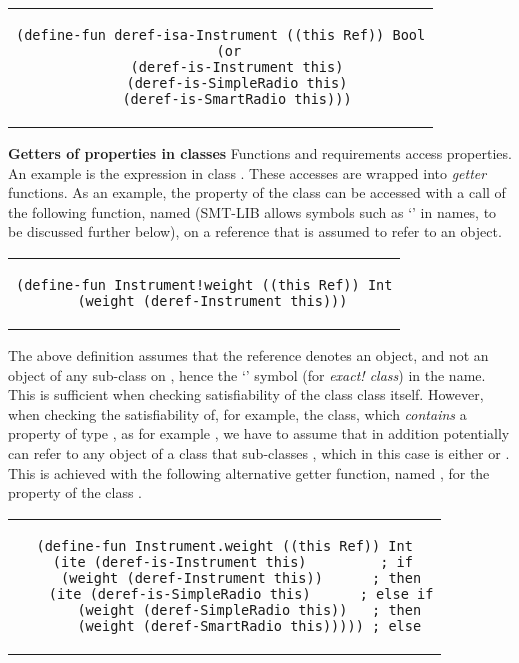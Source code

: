 \begin{center}
\begin{tabular}{c}
\begin{lstlisting}
(define-fun deref-isa-Instrument ((this Ref)) Bool
  (or
    (deref-is-Instrument this)
    (deref-is-SimpleRadio this)
    (deref-is-SmartRadio this)))
\end{lstlisting}
\end{tabular}
\end{center}

\textbf{Getters of properties in classes} Functions and requirements
access properties. An example is the expression  in
class .  These accesses are wrapped into {\em getter}
functions. As an example, the  property of the class
 can be accessed with a call of the following
function, named  (SMT-LIB allows symbols such
as `\code{!}'  in names, to be discussed further below), on a
reference that is assumed to refer to an  object.

\begin{center}
\begin{tabular}{c}
\begin{lstlisting}
(define-fun Instrument!weight ((this Ref)) Int
  (weight (deref-Instrument this)))
\end{lstlisting}
\end{tabular}
\end{center}

The above definition assumes that the  reference denotes an
 object, and not an object of any sub-class on
, hence the `\code{!}' symbol (for {\em exact!
  class}) in the name.  This is sufficient when checking
satisfiability of the class  class itself. However,
when checking the satisfiability of, for example, the 
class, which {\em contains} a property of type , as
for example , we have to assume that
 in addition potentially can refer to any object of a
class that sub-classes , which in this case is either
 or . This is achieved with the
following alternative getter function, named ,
for the  property of the class .

\begin{center}
\begin{tabular}{c}
\begin{lstlisting}
(define-fun Instrument.weight ((this Ref)) Int
  (ite (deref-is-Instrument this)         ; if
    (weight (deref-Instrument this))      ; then
    (ite (deref-is-SimpleRadio this)      ; else if
      (weight (deref-SimpleRadio this))   ; then
      (weight (deref-SmartRadio this))))) ; else
\end{lstlisting}
\end{tabular}
\end{center}

